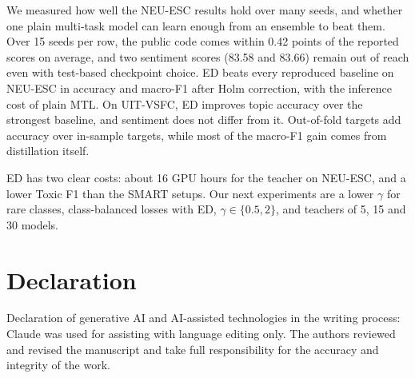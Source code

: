 \documentclass[pdflatex,sn-mathphys-num]{sn-jnl}%
\theoremstyle{thmstyleone}%
\theoremstyle{thmstyletwo}%
\theoremstyle{thmstylethree}%
\begin{document}
We measured how well the NEU-ESC results hold over many seeds, and whether one plain multi-task model can learn enough from an ensemble to beat them. Over 15 seeds per row, the public code comes within 0.42 points of the reported scores on average, and two sentiment scores (83.58 and 83.66) remain out of reach even with test-based checkpoint choice. ED beats every reproduced baseline on NEU-ESC in accuracy and macro-F1 after Holm correction, with the inference cost of plain MTL. On UIT-VSFC, ED improves topic accuracy over the strongest baseline, and sentiment does not differ from it. Out-of-fold targets add accuracy over in-sample targets, while most of the macro-F1 gain comes from distillation itself.

ED has two clear costs: about 16 GPU hours for the teacher on NEU-ESC, and a lower Toxic F1 than the SMART setups. Our next experiments are a lower $\gamma$ for rare classes, class-balanced losses with ED, $\gamma \in \{0.5, 2\}$, and teachers of 5, 15 and 30 models.

\backmatter

\section*{Declaration}

Declaration of generative AI and AI-assisted technologies in the writing process: Claude was used for assisting with language editing only. The authors reviewed and revised the manuscript and take full responsibility for the accuracy and integrity of the work.


\end{document}
